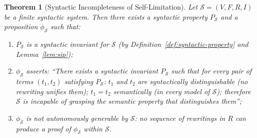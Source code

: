 \documentclass[11pt]{article}
\newtheorem{theorem}{Theorem}[section]
\begin{document}
\begin{theorem}[Syntactic Incompleteness of Self-Limitation]
\label{thm:must-exist}
Let $\mathcal{S} = (V, F, R, I)$ be a finite syntactic system. Then
there exists a syntactic property $P_{\mathcal{S}}$ and a proposition
$\phi_{\mathcal{S}}$ such that:

\begin{enumerate}
  \item $P_{\mathcal{S}}$ is a syntactic invariant for $\mathcal{S}$
        (by Definition~\ref{def:syntactic-property} and
        Lemma~\ref{lem:sip});

  \item $\phi_{\mathcal{S}}$ asserts: ``There exists a syntactic
        invariant $P_{\mathcal{S}}$ such that for every pair of terms
        $(t_1, t_2)$ satisfying $P_{\mathcal{S}}$: $t_1$ and $t_2$ are
        syntactically distinguishable (no rewriting unifies them); $t_1
        = t_2$ semantically (in every model of $\mathcal{S}$); therefore
        $\mathcal{S}$ is incapable of grasping the semantic property
        that distinguishes them'';

  \item $\phi_{\mathcal{S}}$ is not autonomously generable by
        $\mathcal{S}$: no sequence of rewritings in $R$ can produce a
        proof of $\phi_{\mathcal{S}}$ within $\mathcal{S}$.
\end{enumerate}
\end{theorem}
\end{document}

